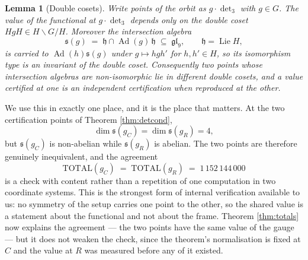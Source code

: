 \documentclass[11pt,reqno]{amsart}
\theoremstyle{plain}
\newtheorem{lemma}[theorem]{Lemma}
\theoremstyle{definition}
\DeclareMathOperator{\Ad}{Ad}
\begin{document}
\begin{lemma}[Double cosets]\label{lem:displ}
Write points of the orbit as $g\cdot\det_3$ with $g\in G$.  The value of the
functional at $g\cdot\det_3$ depends only on the double coset $HgH\in
H\backslash G/H$.
Moreover the \emph{intersection algebra}
\[
  \mathfrak s(g)\;=\;\mathfrak h\cap\Ad(g)\,\mathfrak h
  \;\subseteq\;\mathfrak{gl}_9,
  \qquad \mathfrak h=\operatorname{Lie}H,
\]
is carried to $\Ad(h)\mathfrak s(g)$ under $g\mapsto hgh'$ for $h,h'\in H$, so
its isomorphism type is an invariant of the double coset.  Consequently two points whose intersection algebras are non-isomorphic
lie in different double cosets, and a value certified at one is an independent
certification when reproduced at the other.
\end{lemma}

We use this in exactly one place, and it is the place that matters.  At the two
certification points of Theorem \ref{thm:detcond},
\[
  \dim\mathfrak s(g_C)=\dim\mathfrak s(g_R)=4,
\]
but $\mathfrak s(g_C)$ is non-abelian while $\mathfrak s(g_R)$ is abelian.  The
two points are therefore genuinely inequivalent, and the agreement
\[
  \mathrm{TOTAL}(g_C)\;=\;\mathrm{TOTAL}(g_R)\;=\;1\,152\,144\,000
\]
is a check with content rather than a repetition of one computation in two
coordinate systems.  This is the strongest form of internal verification
available to us: no symmetry of the setup carries one point to the other, so
the shared value is a statement about the functional and not about the frame.
Theorem \ref{thm:totals} now explains the agreement --- the two points have the
same value of the gauge --- but it does not weaken the check, since the
theorem's normalisation is fixed at $C$ and the value at $R$ was measured
before any of it existed.
\end{document}

